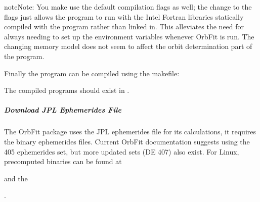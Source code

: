 \documentclass[letterpaper,11pt,english]{sphinxmanual}
\begin{document}
\begin{sphinxVerbatim}[commandchars=\\\{\}]
         
\end{sphinxVerbatim}

\begin{sphinxadmonition}{note}{Note:}
\sphinxAtStartPar
You make use the default compilation flags as well; the change to the
flags just allows the program to run with the Intel Fortran libraries
statically compiled with the program rather than linked in. This alleviates
the need for always needing to set up the environment variables whenever
OrbFit is run. The changing memory model does not seem to affect the orbit
determination part of the program.
\end{sphinxadmonition}

\sphinxAtStartPar
Finally the program can be compiled using the makefile:

\begin{sphinxVerbatim}[commandchars=\\\{\}]
\end{sphinxVerbatim}

\sphinxAtStartPar
The compiled programs should exist in .


\subparagraph{Download JPL Ephemerides File}
\label{\detokenize{technical/installation/orbfit:download-jpl-ephemerides-file}}
\sphinxAtStartPar
The OrbFit package uses the JPL ephemerides file for its calculations, it
requires the binary ephemerides files. Current OrbFit documentation suggests
using the 405 ephemerides set, but more updated sets (DE 407) also exist. For
Linux, precomputed binaries can be found at
%
\begin{footnote}[41]\sphinxAtStartFootnote
{}
%
\end{footnote}  and the
%
\begin{footnote}[42]\sphinxAtStartFootnote
{}
%
\end{footnote}.
\end{document}
